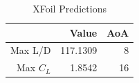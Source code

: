 \begin{table}[]
\caption{XFoil Predictions}
	\centering
	\begin{tabular}{|r|r|r|} \hline
				& Value	& AoA \\ \hline \hline
		Max L/D & 117.1309 & 8 \\ \hline
		Max $C_L$ & 1.8542 & 16 \\ \hline	
	\end{tabular}
\end{table}


